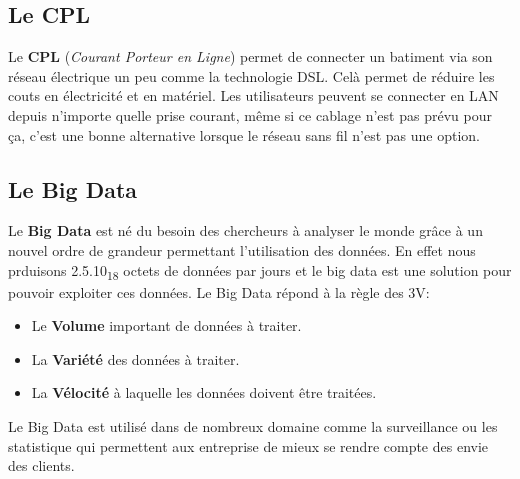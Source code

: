  \subsection{Le CPL}
 Le \textbf{CPL} (\textit{Courant Porteur en Ligne}) permet de connecter un batiment via son réseau électrique un peu comme la technologie DSL\@. Celà permet de réduire les couts en électricité et en matériel. Les utilisateurs peuvent se connecter en LAN depuis n'importe quelle prise courant, même si ce cablage n'est pas prévu pour ça, c'est une bonne alternative lorsque le réseau sans fil n'est pas une option.

 \subsection{Le Big Data}
 Le \textbf{Big Data} est né du besoin des chercheurs à analyser le monde grâce à un nouvel ordre de grandeur permettant l'utilisation des données. En effet nous prduisons 2.5.10\textsubscript{18} octets de données par jours et le big data est une solution pour pouvoir exploiter ces données. Le Big Data répond à la règle des 3V\@:
 \begin{itemize}
	 \item Le \textbf{Volume} important de données à traiter.
	 \item La \textbf{Variété} des données à traiter.
	 \item La \textbf{Vélocité} à laquelle les données doivent être traitées.
 \end{itemize}
 Le Big Data est utilisé dans de nombreux domaine comme la surveillance ou les statistique qui permettent aux entreprise de mieux se rendre compte des envie des clients.
